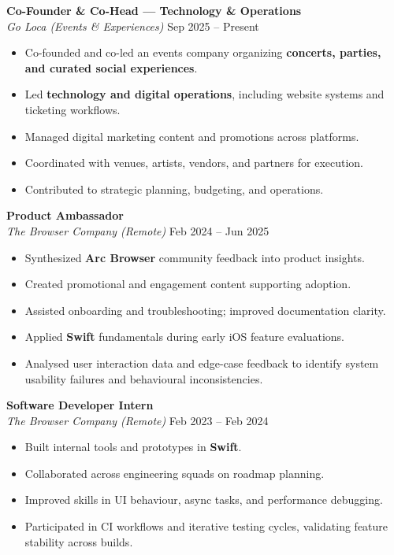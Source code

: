 \documentclass[a4paper,10pt]{article}
\begin{document}
\textbf{Co-Founder \& Co-Head — Technology \& Operations}\\
\emph{Go Loca (Events \& Experiences)} \hfill Sep 2025 -- Present
\begin{itemize}[leftmargin=*]
    \item Co-founded and co-led an events company organizing \textbf{concerts, parties, and curated social experiences}.
    \item Led \textbf{technology and digital operations}, including website systems and ticketing workflows.
    \item Managed digital marketing content and promotions across platforms.
    \item Coordinated with venues, artists, vendors, and partners for execution.
    \item Contributed to strategic planning, budgeting, and operations.
\end{itemize}

\textbf{Product Ambassador}\\
\emph{The Browser Company (Remote)} \hfill Feb 2024 -- Jun 2025
\begin{itemize}[leftmargin=*]
    \item Synthesized \textbf{Arc Browser} community feedback into product insights.
    \item Created promotional and engagement content supporting adoption.
    \item Assisted onboarding and troubleshooting; improved documentation clarity.
    \item Applied \textbf{Swift} fundamentals during early iOS feature evaluations.
    \item Analysed user interaction data and edge-case feedback to identify system usability failures and behavioural inconsistencies.
\end{itemize}

\textbf{Software Developer Intern}\\
\emph{The Browser Company (Remote)} \hfill Feb 2023 -- Feb 2024
\begin{itemize}[leftmargin=*]
    \item Built internal tools and prototypes in \textbf{Swift}.
    \item Collaborated across engineering squads on roadmap planning.
    \item Improved skills in UI behaviour, async tasks, and performance debugging.
    \item Participated in CI workflows and iterative testing cycles, validating feature stability across builds.
\end{itemize}
\end{document}
